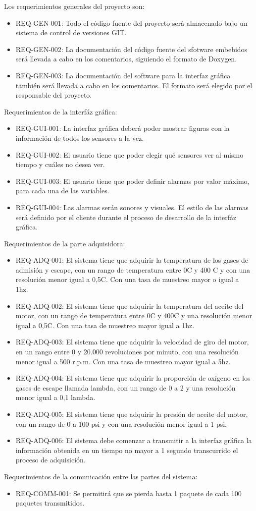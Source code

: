 Los requerimientos generales del proyecto son:
\begin{itemize}
\item REQ-GEN-001: Todo el código fuente del proyecto será almacenado bajo un sistema de control de versiones GIT.
\item REQ-GEN-002: La documentación del código fuente del sfotware embebidos será llevada a cabo en los comentarios, siguiendo el formato de Doxygen.
\item REQ-GEN-003: La documentación del software para la interfaz gráfica también será llevada a cabo en los comentarios. El formato será elegido por el responsable del proyecto.
\end{itemize}

Requerimientos de la interfáz gráfica:
\begin{itemize}
\item REQ-GUI-001: La interfaz gráfica deberá poder mostrar figuras con la información de todos los sensores a la vez.
\item REQ-GUI-002: El usuario tiene que poder elegir qué sensores ver al mismo tiempo y cuáles no desea ver.
\item REQ-GUI-003: El usuario tiene que poder definir alarmas por valor máximo, para cada una de las variables.
\item REQ-GUI-004: Las alarmas serán sonores y visuales. El estilo de las alarmas será definido por el cliente durante el proceso de desarrollo de la interfáz gráfica.
\end{itemize}

Requerimientos de la parte adquisidora:
\begin{itemize}
\item REQ-ADQ-001: El sistema tiene que adquirir la temperatura de los gases de admisión y escape, con un rango de temperatura entre 0\degree C y 400 \degree C y con una resolución menor igual a 0,5\degree C. Con una tasa de muestreo mayor o igual a 1hz.
\item REQ-ADQ-002: El sistema tiene que adquirir la temperatura del aceite del motor, con un rango de temperatura entre 0\degree C y 400\degree C y una resolución menor igual a 0,5\degree C. Con una tasa de muestreo mayor igual a 1hz.
\item REQ-ADQ-003: El sistema tiene que adquirir la velocidad de giro del motor, en un rango entre 0 y 20.000 revoluciones por minuto, con una resolución menor igual a 500 r.p.m. Con una tasa de muestreo mayor igual a 5hz.
\item REQ-ADQ-004: El sistema tiene que adquirir la proporción de oxígeno en los gases de escape llamada lambda, con un rango de 0 a 2 y una resolución menor igual a 0,1 lambda.
\item REQ-ADQ-005: El sistema tiene que adquirir la presión de aceite del motor, con un rango de 0 a 100 psi y con una resolución menor igual a 1 psi.
\item REQ-ADQ-006: El sistema debe comenzar a transmitir a la interfaz gráfica la información obtenida en un tiempo no mayor a 1 segundo transcurrido el proceso de adquisición.
\end{itemize}

Requerimientos de la comunicación entre las partes del sistema:
\begin{itemize}
\item REQ-COMM-001: Se permitirá que se pierda hasta 1 paquete de cada 100 paquetes transmitidos.
\end{itemize}
